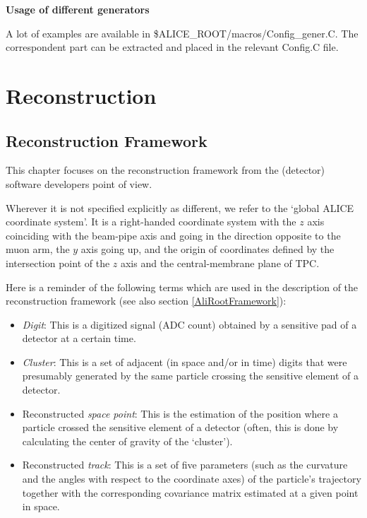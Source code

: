 \documentclass[12pt,a4paper,twoside]{article}
\begin{document}
\noindent
\textbf{Usage of different generators}

A lot of examples are available in
\$ALICE\_ROOT/macros/Config\_gener.C. The correspondent part can be
extracted and placed in the relevant Config.C file.




\newpage 
\section{Reconstruction}


\subsection{Reconstruction Framework}

This chapter
focuses on the reconstruction framework from the (detector) software
developers point of view. 

Wherever it is not specified explicitly as different,  we refer 
to the `global ALICE coordinate system'\cite{CoordinateSystem}. It is a right-handed coordinate
system with
the $z$ axis coinciding with the beam-pipe axis and going in the direction 
opposite to the muon arm, the $y$ axis going up, and the origin of
coordinates defined by the intersection point of the $z$ axis 
and the central-membrane plane of TPC.

Here is a reminder of the following terms which are used in the
description of the reconstruction framework (see also section \ref{AliRootFramework}):
\begin{itemize}
\item {\it Digit}: This is a digitized signal (ADC count) obtained by 
  a sensitive pad of a detector at a certain time.
\item {\it Cluster}: This is a set of adjacent (in space and/or in time)
  digits that were presumably generated by the same particle crossing the 
  sensitive element of a detector.
\item Reconstructed {\it space point}: This is the estimation of the
  position where a particle crossed the sensitive element of a detector
  (often, this is done by calculating the center of gravity of the
  `cluster').
\item Reconstructed {\it track}: This is a set of five parameters (such as the
  curvature and the angles with respect to the coordinate axes) of the particle's
  trajectory together with the corresponding covariance matrix estimated at a given
  point in space.

\end{itemize}
\end{document}
